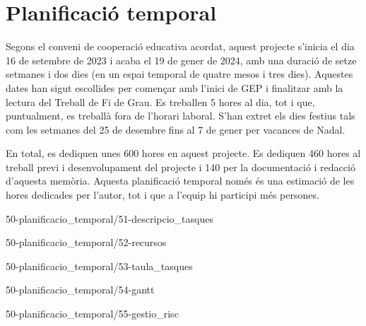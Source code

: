\chapter{Planificació temporal}

Segons el conveni de cooperació educativa acordat, aquest projecte s'inicia el dia 16 de setembre de 2023 i acaba el 19 de gener de 2024, amb una duració de setze setmanes i dos dies (en un espai temporal de quatre mesos i tres dies). Aquestes dates han sigut escollides per començar amb l'inici de GEP i finalitzar amb la lectura del Treball de Fi de Grau. Es treballen 5 hores al dia, tot i que, puntualment, es treballà fora de l'horari laboral. S'han extret els dies festius tals com les setmanes del 25 de desembre fins al 7 de gener per vacances de Nadal.

En total, es dediquen unes 600 hores en aquest projecte. Es dediquen 460 hores al treball previ i desenvolupament del projecte i 140 per la documentació i redacció d'aquesta memòria. Aquesta planificació temporal només és una estimació de les hores dedicades per l'autor, tot i que a l'equip hi participi més persones.

{50-planificacio_temporal/51-descripcio_tasques}

{50-planificacio_temporal/52-recursos}

{50-planificacio_temporal/53-taula_tasques}

{50-planificacio_temporal/54-gantt}

{50-planificacio_temporal/55-gestio_risc}
